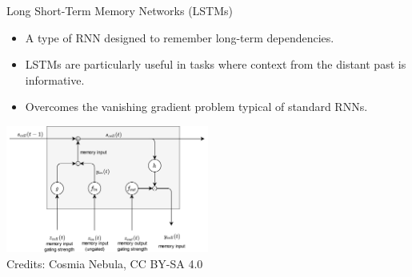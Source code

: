 \documentclass[aspectratio=169]{../latex_main/tntbeamer}  %
\begin{document}
        \begin{frame}{Long Short-Term Memory Networks (LSTMs)}
        \begin{itemize}
            \item A type of RNN designed to remember long-term dependencies.
            \item LSTMs are particularly useful in tasks where context from the distant past is informative.
            \item Overcomes the vanishing gradient problem typical of standard RNNs.
        \end{itemize}
        \centering
        \includegraphics[width=0.5\textwidth]{figure/lstm.png}\\
        Credits: Cosmia Nebula, CC BY-SA 4.0
        \end{frame}

\end{document}

